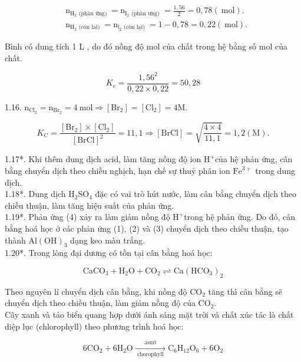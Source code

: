 \documentclass[10pt]{article}
\begin{document}
$$
\begin{aligned}
& \mathrm{n}_{\mathrm{H}_{2} \text { (phàn ứng) }}=\mathrm{n}_{\mathrm{I}_{2} \text { (phàn ưng) }}=\frac{1,56}{2}=0,78(\mathrm{~mol}) . \\
& \mathrm{n}_{\mathrm{H}_{2} \text { (cón laì) }}=\mathrm{n}_{\mathrm{l}_{2} \text { (còn lại) }}=1-0,78=0,22(\mathrm{~mol}) .
\end{aligned}
$$

Bình có dung tích 1 L , do đó nồng độ mol của chất trong hệ bằng số mol của chất.

$$
K_{c}=\frac{1,56^{2}}{0,22 \times 0,22}=50,28
$$

1.16. $\mathrm{n}_{\mathrm{Cl}_{2}}=\mathrm{n}_{\mathrm{Br}_{2}}=4 \mathrm{~mol} \Rightarrow\left[\mathrm{Br}_{2}\right]=\left[\mathrm{Cl}_{2}\right]=4 \mathrm{M}$.

$$
K_{\mathrm{C}}=\frac{\left[\mathrm{Br}_{2}\right] \times\left[\mathrm{Cl}_{2}\right]}{[\mathrm{BrCl}]^{2}}=11,1 \Rightarrow[\mathrm{BrCl}]=\sqrt{\frac{4 \times 4}{11,1}}=1,2(\mathrm{M}) .
$$

1.17*. Khi thêm dung dịch acid, làm tăng nồng độ ion $\mathrm{H}^{+}$của hệ phản ứng, cân bằng chuyển dịch theo chiều nghịch, hạn chế sự thuỷ phân ion $\mathrm{Fe}^{3+}$ trong dung dịch.\\
1.18*. Dung dịch $\mathrm{H}_{2} \mathrm{SO}_{4}$ đặc có vai trò hút nước, làm cân bằng chuyển dịch theo chiều thuận, làm tăng hiệu suất của phản ứng.\\
1.19*. Phản ứng (4) xảy ra làm giảm nồng độ $\mathrm{H}^{+}$trong hệ phản ứng. Do đó, cân bằng hoá học ở các phản ứng (1), (2) và (3) chuyển dịch theo chiều thuận, tạo thành $\mathrm{Al}(\mathrm{OH})_{3}$ dạng keo màu trắng.\\
1.20*. Trong lòng đại dương có tồn tại cân bằng hoá học:

$$
\mathrm{CaCO}_{3}+\mathrm{H}_{2} \mathrm{O}+\mathrm{CO}_{2} \rightleftharpoons \mathrm{Ca}\left(\mathrm{HCO}_{3}\right)_{2}
$$

Theo nguyên lí chuyển dịch cân bằng, khi nồng độ $\mathrm{CO}_{2}$ tăng thì cân bằng sẽ chuyển dịch theo chiều thuận, làm giảm nồng độ của $\mathrm{CO}_{2}$.\\
Cây xanh và tảo biển quang hợp dưới ánh sáng mặt trời và chất xúc tác là chất diệp lục (chlorophyll) theo phương trình hoá học:

$$
6 \mathrm{CO}_{2}+6 \mathrm{H}_{2} \mathrm{O} \xrightarrow[\text { chorophyll }]{\text { asmt }} \mathrm{C}_{6} \mathrm{H}_{12} \mathrm{O}_{6}+6 \mathrm{O}_{2}
$$
\end{document}
